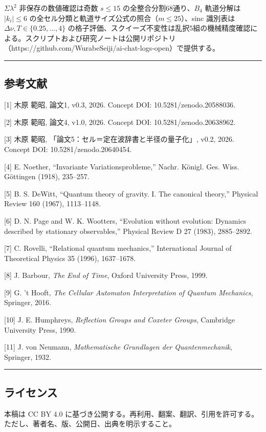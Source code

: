 \documentclass[
]{ltjsarticle}
\begin{document}
\(\Sigma\lambda^2\) 非保存の数値確認は奇数 \(s\le15\)
の全整合分割68通り、\(B_4\) 軌道分解は \(|k_i|\le6\)
の全セル分類と軌道サイズ公式の照合（\(m\le25\)）、sinc 識別表は
\(\Delta\nu, T\in\{0.25,\ldots,4\}\)
の格子評価、スクイーズ不変性は乱択5組の機械精度確認による。スクリプトおよび研究ノートは公開リポジトリ（https://github.com/WurabeSeiji/ai-chat-logs-open）で提供する。

\begin{center}\rule{0.5\linewidth}{0.5pt}\end{center}

\subsection{参考文献}\label{ux53c2ux8003ux6587ux732e}

{[}1{]} 木原 範昭, 論文1, v0.3, 2026. Concept DOI:
10.5281/zenodo.20588036.

{[}2{]} 木原 範昭, 論文4, v1.0, 2026. Concept DOI:
10.5281/zenodo.20638962.

{[}3{]} 木原 範昭, 「論文5：セル＝定在波辞書と半径の量子化」, v0.2,
2026. Concept DOI: 10.5281/zenodo.20640454.

{[}4{]} E. Noether, ``Invariante Variationsprobleme,'' Nachr. Königl.
Ges. Wiss. Göttingen (1918), 235--257.

{[}5{]} B. S. DeWitt, ``Quantum theory of gravity. I. The canonical
theory,'' Physical Review 160 (1967), 1113--1148.

{[}6{]} D. N. Page and W. K. Wootters, ``Evolution without evolution:
Dynamics described by stationary observables,'' Physical Review D 27
(1983), 2885--2892.

{[}7{]} C. Rovelli, ``Relational quantum mechanics,'' International
Journal of Theoretical Physics 35 (1996), 1637--1678.

{[}8{]} J. Barbour, \emph{The End of Time}, Oxford University Press,
1999.

{[}9{]} G. 't Hooft, \emph{The Cellular Automaton Interpretation of
Quantum Mechanics}, Springer, 2016.

{[}10{]} J. E. Humphreys, \emph{Reflection Groups and Coxeter Groups},
Cambridge University Press, 1990.

{[}11{]} J. von Neumann, \emph{Mathematische Grundlagen der
Quantenmechanik}, Springer, 1932.

\begin{center}\rule{0.5\linewidth}{0.5pt}\end{center}

\subsection{ライセンス}\label{ux30e9ux30a4ux30bbux30f3ux30b9}

本稿は CC BY 4.0
に基づき公開する。再利用、翻案、翻訳、引用を許可する。ただし、著者名、版、公開日、出典を明示すること。
\end{document}
